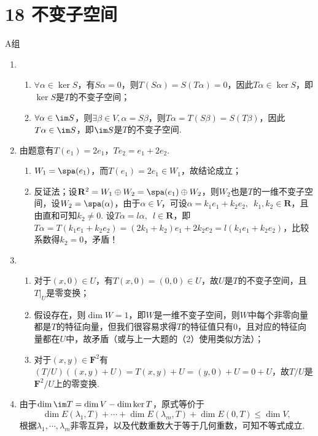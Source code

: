 \section*{18 不变子空间}

\vspace{2ex}

\centerline{\heiti A组}
\begin{enumerate}
    \item \begin{enumerate}
        \item $\forall\alpha\in\ker S$，有$S\alpha=0$，则$T(S\alpha)=S(T\alpha)=0$，因此$T\alpha\in\ker S$，即$\ker S$是$T$的不变子空间；
        \item $\forall\alpha\in\im S$，则$\exists\beta\in V, \alpha=S\beta$，则$T\alpha=T(S\beta)=S(T\beta)$，因此$T\alpha\in\im S$，即$\im S$是$T$的不变子空间.
    \end{enumerate}

    \item 由题意有$T(e_1)=2e_1$，$Te_2=e_1+2e_2$.
    \begin{enumerate}
        \item $W_1=\spa(e_1)$，而$T(e_1)=2e_1\in W_1$，故结论成立；
        \item 反证法；设$\mathbf{R}^2=W_1\oplus W_2=\spa(e_1)\oplus W_2$，则$W_2$也是$T$的一维不变子空间，设$W_2=\spa(\alpha)$，由于$\alpha\in V$，可设$\alpha=k_1e_1+k_2e_2,\enspace k_1,k_2\in\mathbf{R}$，且由直和可知$k_2\neq 0$. 设$T\alpha=l\alpha,\enspace l\in\mathbf{R}$，即$T\alpha=T(k_1e_1+k_2e_2)=(2k_1+k_2)e_1+2k_2e_2=l(k_1e_1+k_2e_2)$，比较系数得$k_2=0$，矛盾！
    \end{enumerate}

    \item \begin{enumerate}
        \item 对于$(x,0)\in U$，有$T(x,0)=(0,0)\in U$，故$U$是$T$的不变子空间，且$T\vert_U$是零变换；
        \item 假设存在，则$\dim W=1$，即$W$是一维不变子空间，则$W$中每个非零向量都是$T$的特征向量，但我们很容易求得$T$的特征值只有0，且对应的特征向量都在$U$中，故矛盾（或与上一大题的（2）使用类似方法）；
        \item 对于$(x,y)\in\mathbf{F}^2$有$(T/U)((x,y)+U)=T(x,y)+U=(y,0)+U=0+U$，故$T/U$是$\mathbf{F}^2/U$上的零变换.
    \end{enumerate}

    \item 由于$\dim\im T=\dim V-\dim\ker T$，原式等价于
    \[ \dim E(\lambda_1,T)+\cdots+\dim E(\lambda_m,T)+\dim E(0,T)\leqslant\dim V, \]
    根据$\lambda_1,\cdots,\lambda_m$非零互异，以及代数重数大于等于几何重数，可知不等式成立.


\end{enumerate}

